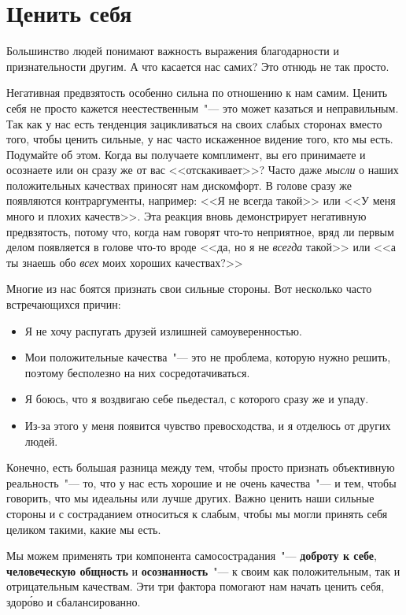 
\chapter{Ценить себя} \label{Self-Appreciation}

Большинство людей понимают важность выражения благодарности и признательности другим. А что касается нас самих? Это отнюдь не так просто.

Негативная предвзятость особенно сильна по отношению к нам самим. Ценить себя не просто кажется неестественным~"--- это может казаться и неправильным. Так как у нас есть тенденция зацикливаться на своих слабых сторонах вместо того, чтобы ценить сильные, у нас часто искаженное видение того, кто мы есть. Подумайте об этом. Когда вы получаете комплимент, вы его принимаете и осознаете или он сразу же от вас <<отскакивает>>? Часто даже \emph{мысли} о наших положительных качествах приносят нам дискомфорт. В голове сразу же появляются контраргументы, например: <<Я не всегда такой>> или <<У меня много и плохих качеств>>. Эта реакция вновь демонстрирует негативную предвзятость, потому что, когда нам говорят что-то неприятное, вряд ли первым делом появляется в голове что-то вроде <<да, но я не \emph{всегда} такой>> или <<а ты знаешь обо \emph{всех} моих хороших качествах?>> 

Многие из нас боятся признать свои сильные стороны. Вот несколько часто встречающихся причин:

\begin{itemize}
	\item Я не хочу распугать друзей излишней самоуверенностью. 
	\item Мои положительные качества~"--- это не проблема, которую нужно решить, поэтому бесполезно на них сосредотачиваться. 
	\item Я боюсь, что я воздвигаю себе пьедестал, с которого сразу же и упаду. 
	\item Из-за этого у меня появится чувство превосходства, и я отделюсь от других людей.
\end{itemize}

Конечно, есть большая разница между тем, чтобы просто признать объективную реальность~"--- то, что у нас есть хорошие и не очень качества~"--- и тем, чтобы говорить, что мы идеальны или лучше других. Важно ценить наши сильные стороны и с состраданием относиться к слабым, чтобы мы могли принять себя целиком такими, какие мы есть. 

Мы можем применять три компонента самосострадания~"--- \textbf{доброту к себе}, \textbf{человеческую общность} и \textbf{осознанность}~"--- к своим как положительным, так и отрицательным качествам. Эти три фактора помогают нам начать ценить себя, здор\'{о}во и сбалансированно. 

